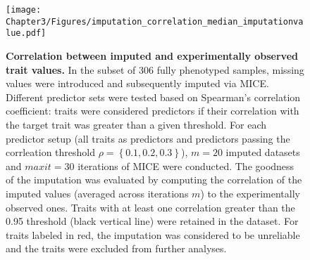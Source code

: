 \begin{figure}[hbtp]
	\centering
	\texttt{[image: Chapter3/Figures/imputation\_correlation\_median\_imputationvalue.pdf]}
	\caption[\textbf{Correlation between imputed and experimentally observed trait values.}]{\textbf{Correlation between imputed and experimentally observed trait values.} In the subset of \num{306} fully phenotyped samples, missing values were introduced and subsequently imputed via MICE. Different predictor sets were tested based on Spearman's correlation coefficient: traits were considered predictors if their correlation with the target trait was greater than a given threshold. For each predictor setup (all traits as predictors and predictors passing the corrleation threshold \(\rho =\left\{0.1, 0.2, 0.3\right\}\)), \(m=20\) imputed datasets and \(maxit=30\) iterations of MICE were conducted. The goodness of the imputation was evaluated by computing the correlation of the imputed values (averaged across iterations \(m\)) to the experimentally observed ones. Traits with at least one correlation greater than the \num{0.95} threshold (black vertical line) were retained in the dataset. For traits labeled in red, the imputation was considered to be unreliable and the traits were excluded from further analyses. }
 	\label{fig:mice}
\end{figure}


